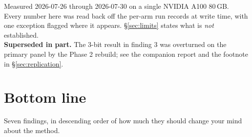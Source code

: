 \documentclass[11pt]{article}
\begin{document}
\begin{titlepage}
\vfill
{\small\color{dqgrey}
Measured 2026-07-26 through 2026-07-30 on a single NVIDIA A100 80\,GB.\\
Every number here was read back off the per-arm run records at write time, with one exception
flagged where it appears. \S\ref{sec:limits} states what is \emph{not} established.\\[0.4em]
\textbf{Superseded in part.} The 3-bit result in finding 3 was overturned on the primary panel
by the Phase 2 rebuild; see the companion report and the footnote in \S\ref{sec:replication}.\par}
\vspace{0.6em}
\end{titlepage}

\tableofcontents
\newpage

\section{Bottom line}

Seven findings, in descending order of how much they should change your mind about the method.
\end{document}
